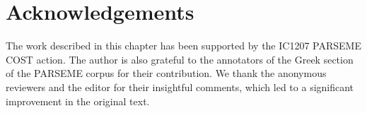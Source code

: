 \documentclass[output=paper,colorlinks,citecolor=brown]{langscibook}
\begin{document}
\section*{Acknowledgements}
The work described in this chapter has been supported by the IC1207 PARSEME COST action. The author is also grateful to the annotators of the Greek section of the PARSEME corpus for their contribution. We thank the anonymous reviewers and the editor for their insightful comments, which led to a significant improvement in the original text.


\sloppy
\printbibliography[heading=subbibliography,notkeyword=this]
\end{document}
